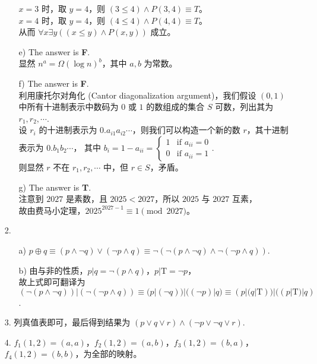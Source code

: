 \documentclass{ctexbook}
\begin{document}
\begin{enumerate}
\begin{enumerate}
        $x=3$ 时，取 $y=4$，则 $(3\leq 4)\land P(3,4)\equiv T$。\\
        $x=4$ 时，取 $y=4$，则 $(4\leq 4)\land P(4,4)\equiv T$。\\
        从而 $\forall x\exists y((x\leq y)\land P(x,y))$ 成立。
        \item [e)] The answer is \textbf{F}. \\
        显然 $n^a=\Omega(\log n)^b$，其中 $a, b$ 为常数。
        \item [f)] The answer is \textbf{F}. \\
        利用康托尔对角化 (Cantor diagonalization argument)，我们假设 $(0,1)$ 中所有十进制表示中数码为 $0$ 或 $1$ 的数组成的集合 $S$ 可数，列出其为 $r_1,r_2,\cdots$.\\
        设 $r_i$ 的十进制表示为 $0.a_{i1}a_{i2}\cdots$，则我们可以构造一个新的数 $r$，其十进制表示为 $0.b_1b_2\cdots$，
        其中 $b_i=1-a_{ii}=\begin{cases}
            1 & \text{if } a_{ii}=0 \\
            0 & \text{if } a_{ii}=1
        \end{cases}$.\\
        则显然 $r$ 不在 $r_1,r_2,\cdots$ 中，但 $r\in S$，矛盾。
        \item [g)] The answer is \textbf{T}. \\
        注意到 $2027$ 是素数，且 $2025<2027$，所以 $2025$ 与 $2027$ 互素，\\
        故由费马小定理，$2025^{2027-1}\equiv 1\pmod{2027}$。
    \end{enumerate}
    \item[2.] \begin{enumerate}
        \item[a)] $p\oplus q\equiv(p\land\lnot q)\lor(\lnot p\land q)\equiv\lnot(\lnot(p\land\lnot q)\land\lnot(\lnot p\land q))$.
        \item[b)] 由与非的性质，$p|q=\lnot(p\land q)$，$p|\mathrm{T}=\lnot p$，\\
        故上式即可翻译为 $(\lnot(p\land\lnot q))|(\lnot(\lnot p\land q))\equiv (p|(\lnot q))|((\lnot p)|q)\equiv (p|(q|\mathrm{T}))|((p|\mathrm{T})|q)$.
    \end{enumerate}
    \item[3.] 列真值表即可，最后得到结果为 $(p\lor q\lor r)\land(\lnot p\lor\lnot q\lor r)$.
    \item[4.] $f_1(1,2)=(a,a)$，$f_2(1,2)=(a,b)$，$f_3(1,2)=(b,a)$，$f_4(1,2)=(b,b)$，为全部的映射。\\

\end{enumerate}
\end{document}
